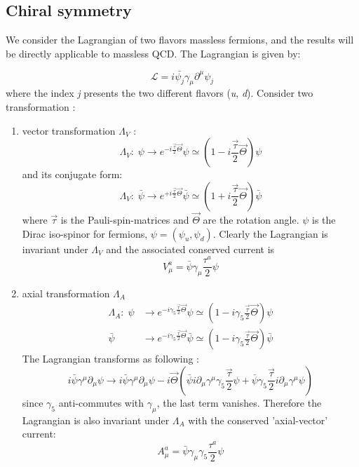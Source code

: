 \subsection{Chiral symmetry}

We consider the Lagrangian of two flavors massless fermions, and the
results will be directly applicable to massless QCD. The Lagrangian
is given by:

\begin{equation}
\mathcal{L}=i\bar{\psi_{j}}\gamma_{\mu}\partial^{\mu}\psi_{j}\label{eq:L_massless}
\end{equation}
where the index \emph{j }presents the two different flavors (\emph{u},
\emph{d}). Consider two transformation :
\begin{enumerate}
\item vector transformation $\Lambda_{V}$ :
\begin{equation}
\Lambda_{V}:\;\psi\rightarrow e^{-i\frac{\vec{\tau}}{2}\vec{\Theta}}\psi\simeq(1-i\frac{\vec{\tau}}{2}\vec{\Theta})\psi
\end{equation}
and its conjugate form:
\begin{equation}
\Lambda_{V}:\;\bar{\psi}\rightarrow e^{+i\frac{\vec{\tau}}{2}\vec{\Theta}}\bar{\psi}\simeq(1+i\frac{\vec{\tau}}{2}\vec{\Theta})\bar{\psi}
\end{equation}
where $\vec{\tau}$ is the Pauli-spin-matrices and $\vec{\Theta}$
are the rotation angle. $\psi$ is the Dirac iso-spinor for fermions,
$\psi=(\psi_{u},\psi_{d})$. Clearly the Lagrangian is invariant under
$\Lambda_{V}$ and the associated conserved current is 
\begin{equation}
V_{\mu}^{a}=\bar{\psi}\gamma_{\mu}\frac{\tau^{a}}{2}\psi
\end{equation}

\item axial transformation $\Lambda_{A}$
\begin{align}
\Lambda_{A}:\;\psi & \rightarrow e^{-i\gamma_{5}\frac{\vec{\tau}}{2}\vec{\Theta}}\psi\simeq(1-i\gamma_{5}\frac{\vec{\tau}}{2}\vec{\Theta})\psi\\
\bar{\psi} & \rightarrow e^{-i\gamma_{5}\frac{\vec{\tau}}{2}\vec{\Theta}}\bar{\psi}\simeq(1-i\gamma_{5}\frac{\vec{\tau}}{2}\vec{\Theta})\bar{\psi}
\end{align}
The Lagrangian transforms as following :
\begin{equation}
i\bar{\psi}\gamma^{\mu}\partial_{\mu}\psi\rightarrow i\bar{\psi}\gamma^{\mu}\partial_{\mu}\psi-i\vec{\Theta}(\bar{\psi}i\partial_{\mu}\gamma^{\mu}\gamma_{5}\frac{\vec{\tau}}{2}\psi+\bar{\psi}\gamma_{5}\frac{\vec{\tau}}{2}i\partial_{\mu}\gamma^{\mu}\psi)
\end{equation}
since $\gamma_{5}$ anti-commutes with $\gamma_{\mu}$, the last term
vanishes. Therefore the Lagrangian is also invariant under $\Lambda_{A}$
with the conserved 'axial-vector' current: 
\begin{equation}
A_{\mu}^{a}=\bar{\psi}\gamma_{\mu}\gamma_{5}\frac{\tau^{a}}{2}\psi
\end{equation}

\end{enumerate}
